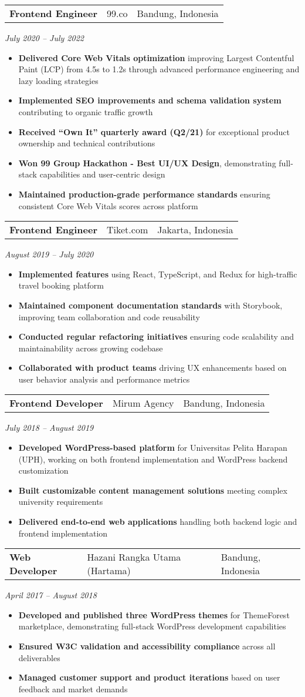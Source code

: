 \documentclass[a4paper, 11pt]{article}
\newcommand{\resumeItem}[1]{
  \item\small{
    {#1 \vspace{-2pt}}
  }
}
\newcommand{\resumeSubheading}[4]{
  \vspace{-2pt}\item
    \begin{tabularx}{0.987\textwidth}[t]{
  >{\raggedright\arraybackslash}X
  >{\centering\arraybackslash}X
  >{\raggedleft\arraybackslash}X }
      \textbf{#1} & #2 & #3 \\
    \end{tabularx}
    \textit{\small#4}\\
    \vspace{-7pt}
}
\newcommand{\resumeItemListStart}{\begin{itemize}[leftmargin=0.22in]}
\newcommand{\resumeItemListEnd}{\end{itemize}\vspace{-5pt}}
\begin{document}
\resumeSubheading
    {Frontend Engineer}{99.co}{Bandung, Indonesia}{July 2020 -- July 2022}
\resumeItemListStart
    \resumeItem{\textbf{Delivered Core Web Vitals optimization} improving Largest Contentful Paint (LCP) from 4.5s to 1.2s through advanced performance engineering and lazy loading strategies}
    \resumeItem{\textbf{Implemented SEO improvements and schema validation system} contributing to organic traffic growth}
    \resumeItem{\textbf{Received ``Own It'' quarterly award (Q2/21)} for exceptional product ownership and technical contributions}
    \resumeItem{\textbf{Won 99 Group Hackathon - Best UI/UX Design}, demonstrating full-stack capabilities and user-centric design}
    \resumeItem{\textbf{Maintained production-grade performance standards} ensuring consistent Core Web Vitals scores across platform}
\resumeItemListEnd

\resumeSubheading
    {Frontend Engineer}{Tiket.com}{Jakarta, Indonesia}{August 2019 -- July 2020}
\resumeItemListStart
    \resumeItem{\textbf{Implemented features} using React, TypeScript, and Redux for high-traffic travel booking platform}
    \resumeItem{\textbf{Maintained component documentation standards} with Storybook, improving team collaboration and code reusability}
    \resumeItem{\textbf{Conducted regular refactoring initiatives} ensuring code scalability and maintainability across growing codebase}
    \resumeItem{\textbf{Collaborated with product teams} driving UX enhancements based on user behavior analysis and performance metrics}
\resumeItemListEnd

\resumeSubheading
    {Frontend Developer}{Mirum Agency}{Bandung, Indonesia}{July 2018 -- August 2019}
\resumeItemListStart
    \resumeItem{\textbf{Developed WordPress-based platform} for Universitas Pelita Harapan (UPH), working on both frontend implementation and WordPress backend customization}
    \resumeItem{\textbf{Built customizable content management solutions} meeting complex university requirements}
    \resumeItem{\textbf{Delivered end-to-end web applications} handling both backend logic and frontend implementation}
\resumeItemListEnd

\resumeSubheading
    {Web Developer}{Hazani Rangka Utama (Hartama)}{Bandung, Indonesia}{April 2017 -- August 2018}
\resumeItemListStart
    \resumeItem{\textbf{Developed and published three WordPress themes} for ThemeForest marketplace, demonstrating full-stack WordPress development capabilities}
    \resumeItem{\textbf{Ensured W3C validation and accessibility compliance} across all deliverables}
    \resumeItem{\textbf{Managed customer support and product iterations} based on user feedback and market demands}
\resumeItemListEnd
\end{document}
